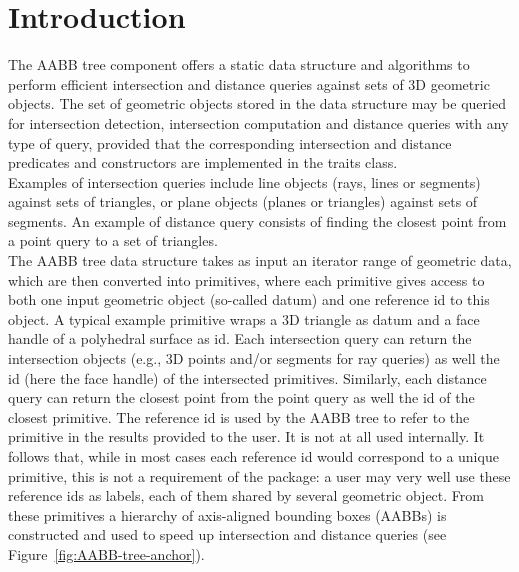 \section{Introduction}
\label{AABB_tree_section_intro}

The AABB tree component offers a static data structure and algorithms to perform efficient intersection and distance queries against sets of 3D geometric objects. The set of geometric objects stored in the data structure may be queried for intersection detection, intersection computation and distance queries with any type of query, provided that the corresponding intersection and distance predicates and constructors are implemented in the traits class.\\

Examples of intersection queries include line objects (rays, lines or segments) against sets of triangles, or plane objects (planes or triangles) against sets of segments. An example of distance query consists of finding the closest point from a point query to a set of triangles.\\

The AABB tree data structure takes as input an iterator range of geometric data, which are then converted into primitives, where each primitive gives access to both one input geometric object (so-called datum) and one reference id to this object. A typical example primitive wraps a 3D triangle as datum and a face handle of a polyhedral surface as id. Each intersection query can return the intersection objects (e.g., 3D points and/or segments for ray queries) as well the id (here the face handle) of the intersected primitives. Similarly, each distance query can return the closest point from the point query as well the id of the closest primitive. The reference id is used by the AABB tree to refer to the primitive in the results provided to the user. It is not at all used internally. It follows that, while in most cases each reference id would correspond to a unique primitive, this is not a requirement of the package: a user may very well use these reference ids as labels, each of them shared by several geometric object. From these primitives a hierarchy of axis-aligned bounding boxes (AABBs) is constructed and used to speed up intersection and distance queries (see Figure~\ref{fig:AABB-tree-anchor}). 

